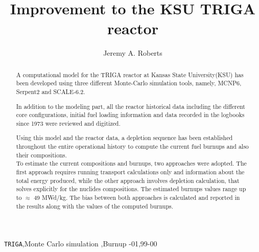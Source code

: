 \documentclass[review,number,sort&compress,12pt]{elsarticle}
\begin{document}
\begin{frontmatter}



\title{Improvement to the KSU TRIGA reactor}


\author{Jeremy A. Roberts}
\address{Department of Mechanical and Nuclear Engineering, Kansas State University, Manhattan, KS 66506, USA}

\begin{abstract}
	A computational model for the TRIGA reactor at Kansas State University(KSU) has been developed using three 
	different Monte-Carlo simulation tools, namely, MCNP6, Serpent2 and SCALE-6.2.
	
	In addition to the modeling part, all the reactor historical data including the different core configurations, initial fuel loading information and data recorded in the logbooks since 1973 were reviewed and digitized.
	
	Using this model and the reactor data, a depletion sequence has been established throughout the entire 
	operational history to compute the current fuel burnups and also their compositions.\\
	To estimate the current compositions and burnups, two approaches were adopted. The first approach requires running transport calculations only and information about the total energy produced, while the other approach involves depletion calculation, that solves explicitly for the nuclides compositions. The estimated burnups values range up to $\approx$ 49 MWd/kg. The bias between both approaches is calculated and reported in the results along with the values of the computed burnups.
	
	
\end{abstract}

\begin{keyword}
	\texttt{TRIGA}\sep Monte Carlo simulation \sep Burnup 
	-01\sep  99-00
\end{keyword}
\end{frontmatter}
\end{document}
